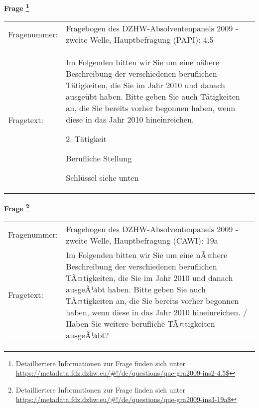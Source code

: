 				\vspace*{0.5cm}
                \noindent\textbf{Frage
	                \footnote{Detailliertere Informationen zur Frage finden sich unter
		              \url{https://metadata.fdz.dzhw.eu/\#!/de/questions/que-gra2009-ins2-4.5$}}}\\
				\begin{tabularx}{\hsize}{@{}lX}
					Fragenummer: &
					  Fragebogen des DZHW-Absolventenpanels 2009 - zweite Welle, Hauptbefragung (PAPI):
					  4.5
 \\
					Fragetext: & Im Folgenden bitten wir Sie um eine nähere Beschreibung der verschiedenen beruflichen Tätigkeiten, die Sie im Jahr 2010 und danach ausgeübt haben. Bitte geben Sie auch Tätigkeiten an, die Sie bereits vorher begonnen haben, wenn diese in das Jahr 2010 hineinreichen.\par  2. Tätigkeit\par  Berufliche Stellung\par  Schlüssel siehe unten \\
				\end{tabularx}
				\vspace*{0.5cm}
                \noindent\textbf{Frage
	                \footnote{Detailliertere Informationen zur Frage finden sich unter
		              \url{https://metadata.fdz.dzhw.eu/\#!/de/questions/que-gra2009-ins3-19a$}}}\\
				\begin{tabularx}{\hsize}{@{}lX}
					Fragenummer: &
					  Fragebogen des DZHW-Absolventenpanels 2009 - zweite Welle, Hauptbefragung (CAWI):
					  19a
 \\
					Fragetext: & Im Folgenden bitten wir Sie um eine nÃ¤here Beschreibung der verschiedenen beruflichen TÃ¤tigkeiten, die Sie im Jahr 2010 und danach ausgeÃ¼bt haben. Bitte geben Sie auch TÃ¤tigkeiten an, die Sie bereits vorher begonnen haben, wenn diese in das Jahr 2010 hineinreichen. / Haben Sie weitere berufliche TÃ¤tigkeiten ausgeÃ¼bt? \\
				\end{tabularx}






